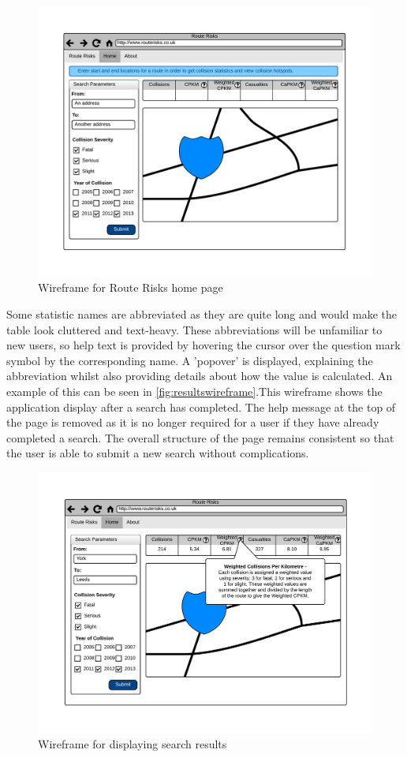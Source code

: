 \documentclass[authoryearcitations]{UoYCSproject}
\begin{document}
\begin{figure}
	\center
	\includegraphics[scale=0.8]{HomePageWireframe}
	\caption{Wireframe for Route Risks home page}
	\label{fig:homewireframe}
\end{figure}

Some statistic names are abbreviated as they are quite long and would make the table look cluttered and text-heavy. These abbreviations will be unfamiliar to new users, so help text is provided by hovering the cursor over the question mark symbol by the corresponding name. A 'popover' is displayed, explaining the abbreviation whilst also providing details about how the value is calculated. An example of this can be seen in \autoref{fig:resultswireframe}.This wireframe shows the application display after a search has completed. The help message at the top of the page is removed as it is no longer required for a user if they have already completed a search. The overall structure of the page remains consistent so that the user is able to submit a new search without complications.

\begin{figure}
	\center
	\includegraphics[scale=0.8]{ResultsWireframe}
	\caption{Wireframe for displaying search results}
	\label{fig:resultswireframe}
\end{figure}
\end{document}
